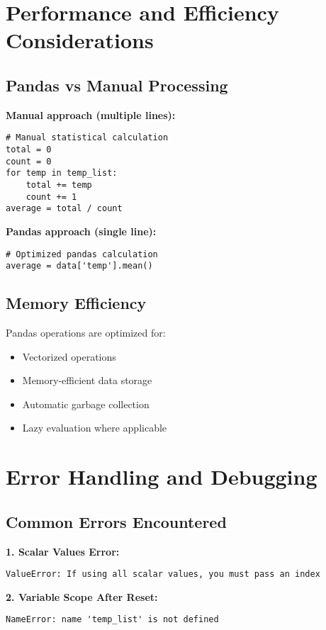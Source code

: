 \documentclass[12pt]{article}
\begin{document}
\section{Performance and Efficiency Considerations}

\subsection{Pandas vs Manual Processing}

\textbf{Manual approach (multiple lines):}
\begin{lstlisting}
# Manual statistical calculation
total = 0
count = 0
for temp in temp_list:
    total += temp
    count += 1
average = total / count
\end{lstlisting}

\textbf{Pandas approach (single line):}
\begin{lstlisting}
# Optimized pandas calculation
average = data['temp'].mean()
\end{lstlisting}

\subsection{Memory Efficiency}

Pandas operations are optimized for:
\begin{itemize}
    \item Vectorized operations
    \item Memory-efficient data storage
    \item Automatic garbage collection
    \item Lazy evaluation where applicable
\end{itemize}

\section{Error Handling and Debugging}

\subsection{Common Errors Encountered}

\textbf{1. Scalar Values Error:}
\begin{verbatim}
ValueError: If using all scalar values, you must pass an index
\end{verbatim}

\textbf{2. Variable Scope After Reset:}
\begin{verbatim}
NameError: name 'temp_list' is not defined
\end{verbatim}
\end{document}
